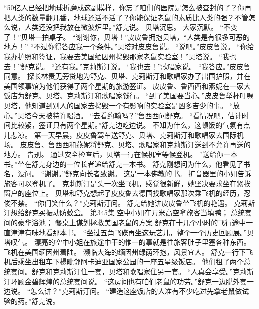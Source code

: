 \documentclass[a4paper,12pt,UTF8,twoside]{ctexbook}
\begin{document}
        “50亿人已经把地球折磨成这副模样，你忘了咱们的医院是怎么被查封的了？你再把人类的数量翻几番，地球还活不活了？你能保证老鼠的素质比人类的强？不管怎么说，人类还没把我放在微波炉里。”舒克说。  
        贝塔沉思。  
        大家沉默。  
        “不变了！”贝塔一拍桌子。        
        “谢谢你，贝塔！”皮皮鲁拥抱贝塔，“人类是有很多可恶的地方！”  
        “不过你得答应我一个条件。”贝塔对皮皮鲁说。  
        “说吧。”皮皮鲁说。  
        “你给我办护照和签证，我要去美国缅因州捣毁那家老鼠实验室！”贝塔说。  
        “我也去！”舒克说。  
        “还有我。”克莉斯汀说。  
        “我也去！”歌唱家说。  
        “我答应。”皮皮鲁同意。  
        探长林责无旁贷地为舒克、贝塔、克莉斯汀和歌唱家办了出国护照，并在美国领事馆为他们获得了两个星期的旅游签证。  
        皮皮鲁、鲁西西和燕妮在一家大饭店为舒克、贝塔、克莉斯汀和歌唱家饯行。  
        “到了美国要当心。”皮皮鲁举杯叮嘱贝塔，他知道到别人的国家去捣毁一个有影响的实验室是凶多吉少的事。  
        “放心。”贝塔今天被特许喝酒。  
        “去看约翰吗？”鲁西西问舒克。  
        “看情况吧，估计时间比较紧，签证只有两个星期。”舒克边吃边说。  
        不知为什么，这顿饭的气氛有点儿悲凉。  
        第一天早晨，皮皮鲁驾车送舒克、贝塔、克莉斯汀和歌唱家去国际机场。  
        皮皮鲁、鲁西西和燕妮将舒克、贝塔、歌唱家和克莉斯汀送到不允许再送的地方。  
        告别。  
        通过安全检查后，贝塔一行在候机室等候登机。  
        “送给你一本书。”坐在舒克身边的一位长者递给舒克一本书。  
        舒克刚想问为什么，他看见了书名，没问。  
        “谢谢。”舒克向长者致谢。  
        这是一本佛教的书。  
        扩音器里的小姐告诉旅客可以登机了。  
        克莉斯汀是头一次坐飞机，感觉很新鲜，她坚决要求坐在紧挨窗户的座位上。  
        贝塔和舒克想起了皮皮鲁去德国找歌唱家那次乘飞机的经历，忍俊不禁。  
        “你们笑什么？”克莉斯汀问。  
        舒克给她讲皮皮鲁坐飞机的艳遇。  
        克莉斯汀想给舒克买振动防蚊盒。          第345集  
        空中小姐在万米高空拿旅客当填鸭；  
        总统套间的豪华浴池；  
        餐桌上谋划拯救美国老鼠的方案    
        舒克在十几个小时的飞行途中一直津津有味地看那本书。  
        “坐过五角飞碟再坐这玩艺儿，整个一个历史回顾展。”贝塔叹气。  
        漂亮的空中小姐在旅途中干的惟一的事就是往旅客肚子里塞各种东西。  
        飞机在美国缅因州着陆。  
        濒临大海的缅因州绿荫环抱，风景宜人。  
        舒克一行下飞机后乘坐出租车下榻毗邻阿卡迪亚国家公园的一座五星级饭店。  
        他们租了两个总统套间。舒克和克莉斯汀住一套，贝塔和歌唱家住另一套。        
        “人真会享受。”克莉斯汀环顾金碧辉煌的总统套间说。  
        “这房间也有咱们老鼠的功劳。”舒克一边脱外套一边说。  
        “怎么讲？”克莉斯汀问。  
        “建造这座饭店的人准有不少吃过先拿老鼠做试验的药。”舒克说。  
\end{document}
